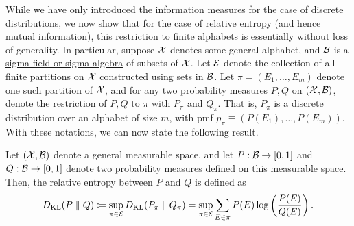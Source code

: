 \documentclass[12pt]{article}
\begin{document}
While we have only introduced the information measures  for the case of discrete distributions, we now show that for the case of relative entropy (and hence mutual information), this restriction to finite alphabets is essentially without loss of generality. In particular, suppose ${\cal X}$ denotes some general alphabet, and ${\cal B}$ is a \href{https://en.wikipedia.org/wiki/%CE%A3-algebra}{sigma-field or sigma-algebra} of subsets of ${\cal X}$. Let ${\cal E}$ denote the collection of all finite partitions on ${\cal X}$ constructed using sets in ${\cal B}$. Let $\pi = (E_1, \ldots, E_m)$ denote one such partition of ${\cal X}$, and for any two probability measures $P,Q$ on $({\cal X}, {\cal B})$, denote the restriction of $P, Q$ to $\pi$ with $P_\pi$ and $Q_\pi$. That is, $P_\pi$ is a discrete distribution over an alphabet of size $m$, with pmf $p_\pi \equiv (P(E_1), \ldots, P(E_m))$. With these notations, we can now state the following result.  
\begin{definition}
\label{def:relative-entropy-general}
Let $({\cal X}, {\cal B})$ denote a general measurable space, and let $P:{\cal B} \to [0,1]$ and $Q:{\cal B} \to [0,1]$ denote two probability measures defined on this measurable space. Then, the relative entropy between $P$ and $Q$ is defined as 
\begin{align}
D_{\text{KL}}(P\parallel Q) \coloneqq \sup_{\pi \in {\cal E}} D_{\text{KL}}(P_\pi \parallel Q_\pi) = \sup_{\pi \in {\cal E}} \sum_{E \in \pi} P(E) \log \left( \frac{P(E)}{Q(E)} \right). 
\end{align}
\end{definition}
\end{document}
